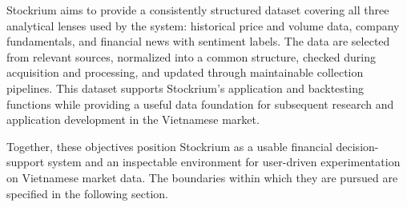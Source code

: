 \begin{enumerate}[label=\textbf{O\arabic*.}, leftmargin=1.7cm]
    Stockrium aims to provide a consistently structured dataset covering all three analytical lenses used by the system: historical price and volume data, company fundamentals, and financial news with sentiment labels. The data are selected from relevant sources, normalized into a common structure, checked during acquisition and processing, and updated through maintainable collection pipelines. This dataset supports Stockrium's application and backtesting functions while providing a useful data foundation for subsequent research and application development in the Vietnamese market.
\end{enumerate}

Together, these objectives position Stockrium as a usable financial decision-support system and an inspectable environment for user-driven experimentation on Vietnamese market data. The boundaries within which they are pursued are specified in the following section.
